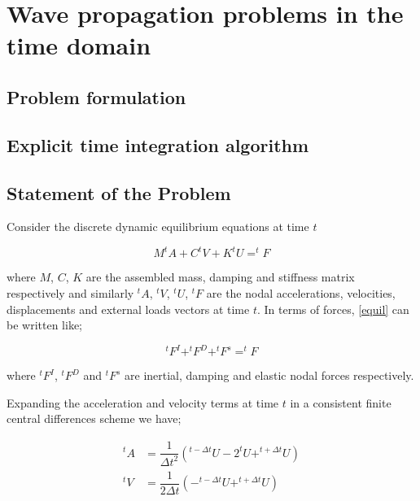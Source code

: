 %

\chapter{Wave propagation problems in the time domain}

\section{Problem formulation}

\section{Explicit time integration algorithm}

\section{Statement of the Problem}
Consider the discrete dynamic equilibrium equations at time $t$

\begin{equation}
M^{t}A+C^{t}V+K^{t}U=^{t}F
\label{equil}
\end{equation}

where $M$, $C$, $K$ are the assembled mass, damping and stiffness matrix respectively and similarly $^{t}A$, $^{t}V$, $^{t}U$, $^{t}F$ are the nodal accelerations, velocities, displacements and external loads vectors at time $t$. In terms of forces, \cref{equil} can be written like;

\begin{equation}
^{t}F^I+^{t}F^D+^{t}F^s=^{t}F
\label{force equil}
\end{equation}

where $^{t}F^I$, $^{t}F^D$ and $^{t}F^s$ are inertial, damping and elastic nodal forces respectively.

Expanding the acceleration and velocity terms at time $t$ in a consistent finite central differences scheme we have;

\begin{equation}
\begin{aligned}
^{t}A&=\dfrac{1}{\Delta t^2}\left(^{t-\Delta t}U-2^{t}U+^{t+\Delta t}U\right)\\
^{t}V&=\dfrac{1}{2\Delta t}\left(-^{t-\Delta t}U+^{t+\Delta t}U\right)
\end{aligned}
\label{finitediff}
\end{equation}

